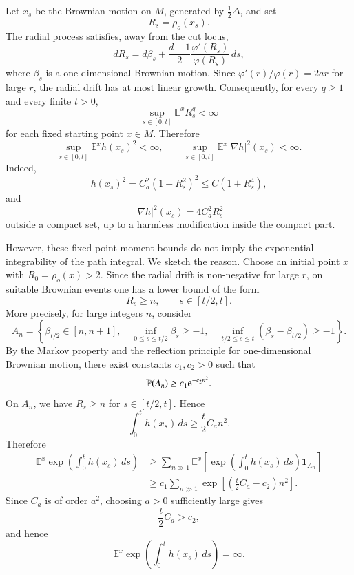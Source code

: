 \documentclass[11pt,twoside, reqno]{article}
\def\e{{\rm e}}
\newcommand\1{\mathbbm{1}}
\theoremstyle{definition}
\numberwithin{equation}{section}
\def \e{{\rm e}}
\begin{document}
Let \(x_s\) be the Brownian motion on \(M\), generated by
\(\frac12\Delta\), and set
\[
        R_s=\rho_o(x_s).
\]
The radial process satisfies, away from the cut locus,
\[
        dR_s=d\beta_s+
        \frac{d-1}{2}\frac{\varphi'(R_s)}{\varphi(R_s)}\,ds,
\]
where \(\beta_s\) is a one-dimensional Brownian motion. Since
\(\varphi'(r)/\varphi(r)=2ar\) for large \(r\), the radial drift has at most
linear growth. Consequently, for every \(q\geq1\) and every finite \(t>0\),
\[
        \sup_{s\in[0,t]}\mathbb E^x R_s^q<\infty
\]
for each fixed starting point \(x\in M\). Therefore
\[
        \sup_{s\in[0,t]}\mathbb E^x h(x_s)^2<\infty,
        \qquad
        \sup_{s\in[0,t]}\mathbb E^x |\nabla h|^2(x_s)<\infty.
\]
Indeed,
\[
        h(x_s)^2
        =
        C_a^2(1+R_s^2)^2
        \leq C(1+R_s^4),
\]
and
\[
        |\nabla h|^2(x_s)
        =
        4C_a^2 R_s^2
\]
outside a compact set, up to a harmless modification inside the compact part.

However, these fixed-point moment bounds do not imply the exponential
integrability of the path integral. We sketch the reason. Choose an initial
point \(x\) with \(R_0=\rho_o(x)>2\). Since the radial drift is non-negative
for large \(r\), on suitable Brownian events one has a lower bound of the form
\[
        R_s\geq n,
        \qquad s\in[t/2,t].
\]
More precisely, for large integers \(n\), consider
\[
A_n=
\left\{
\beta_{t/2}\in[n,n+1],
\quad
\inf_{0\leq s\leq t/2}\beta_s\geq -1,
\quad
\inf_{t/2\leq s\leq t}(\beta_s-\beta_{t/2})\geq -1
\right\}.
\]
By the Markov property and the reflection principle for one-dimensional
Brownian motion, there exist constants \(c_1,c_2>0\) such that
\[
        \mathbb P(A_n)\geq c_1 \e^{-c_2 n^2}.
\]
On \(A_n\), we have \(R_s\geq n\) for \(s\in[t/2,t]\). Hence
\[
        \int_0^t h(x_s)\,ds
        \geq
        \frac t2 C_a n^2.
\]
Therefore
\[
\begin{aligned}
\mathbb E^x
\exp\left(\int_0^t h(x_s)\,ds\right)
&\geq
\sum_{n\gg1}
\mathbb E^x
\left[
\exp\left(\int_0^t h(x_s)\,ds\right)\mathbf 1_{A_n}
\right]  \\
&\geq
c_1
\sum_{n\gg1}
\exp\left[
\left(\frac t2 C_a-c_2\right)n^2
\right].
\end{aligned}
\]
Since \(C_a\) is of order \(a^2\), choosing \(a>0\) sufficiently large gives
\[
        \frac t2 C_a>c_2,
\]
and hence
\[
        \mathbb E^x
        \exp\left(\int_0^t h(x_s)\,ds\right)
        =
        \infty .
\]
\end{document}
